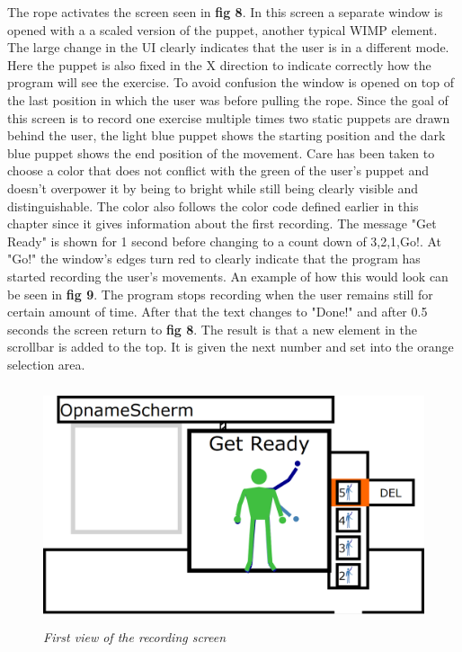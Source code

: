 The rope activates the screen seen in \textbf{ fig 8}. In this screen a separate window is opened with a a scaled version of the puppet, another typical WIMP element. The large change in the UI clearly indicates that the user is in a different mode. Here the puppet is also fixed in the X direction to indicate correctly how the program will see the exercise. To avoid confusion the window is opened on top of the last position in which the user was before pulling the rope. Since the goal of this screen is to record one exercise multiple times two static puppets are drawn behind the user, the light blue puppet shows the starting position and the dark blue puppet shows the end position of the movement. Care has been taken to choose a color that does not conflict with the green of the user's puppet and doesn't overpower it by being to bright while still being clearly visible and distinguishable. The color also follows the color code defined earlier in this chapter since it gives information about the first recording. The message "Get Ready" is shown for 1 second before changing to a count down of 3,2,1,Go!. At "Go!" the window's edges turn red to clearly indicate that the program has started recording the user's movements. An example of how this would look can be seen in \textbf{ fig 9}. The program stops recording when the user remains still for certain amount of time. After that the text changes to "Done!" and after 0.5 seconds the screen return to \textbf{ fig 8}. The result is that a new element in the scrollbar is added to the top. It is given the next number and set into the orange selection area.\\



\begin{figure}[H]
	\begin{center}
		\includegraphics[width=12.5cm, height=7cm]{figures/4_record_getready.png}
		\caption{\emph{First view of the recording screen}}
		\label{The regular view of the end desing of the UI}
	\end{center}
\end{figure}

